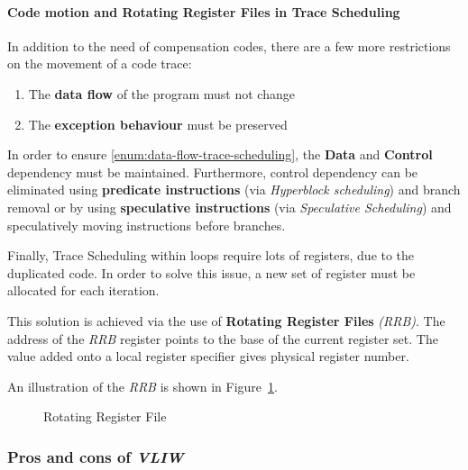 \documentclass[english]{article}
\begin{document}
\paragraph{Code motion and Rotating Register Files in Trace Scheduling}

In addition to the need of compensation codes, there are a few more restrictions on the movement of a code trace:

\begin{enumerate}[label=\Alph*), ref=(\Alph*)]
  \item \label{enum:data-flow-trace-scheduling} The \textbf{data flow} of the program must not change
  \item \label{enum:exception-behaviour-trace-scheduling} The \textbf{exception behaviour} must be preserved
\end{enumerate}

\bigskip

In order to ensure \ref{enum:data-flow-trace-scheduling}, the \textbf{Data} and \textbf{Control} dependency must be maintained.
Furthermore, control dependency can be eliminated using \textbf{predicate instructions} (via \textit{Hyperblock scheduling}) and branch removal or by using \textbf{speculative instructions} (via \textit{Speculative Scheduling}) and speculatively moving instructions before branches.

Finally, Trace Scheduling within loops require lots of registers, due to the duplicated code.
In order to solve this issue, a new set of register must be allocated for each iteration.

This solution is achieved via the use of \textbf{Rotating Register Files} \textit{(RRB)}.
The address of the \textit{RRB} register points to the base of the current register set.
The value added onto a local register specifier gives physical register number.

\bigskip
An illustration of the \textit{RRB} is shown in Figure~\ref{fig:rotating-register-file}.

\begin{figure}[htbp]
  \bigskip
  \centering
  \caption{Rotating Register File}
  \label{fig:rotating-register-file}
  \bigskip
\end{figure}

\subsubsection{Pros and cons of \textit{VLIW}}
\end{document}
